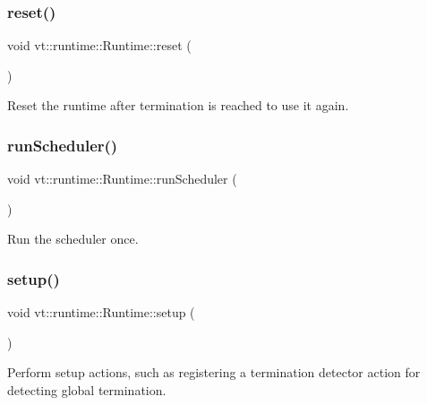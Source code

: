 \subsubsection{\texorpdfstring{reset()}{reset()}}
{\footnotesize\ttfamily void vt\+::runtime\+::\+Runtime\+::reset (\begin{DoxyParamCaption}{ }\end{DoxyParamCaption})}



Reset the runtime after termination is reached to use it again. 

\mbox{\label{structvt_1_1runtime_1_1_runtime_ab9cfe09835261971b73435e0572fee00}} 
\subsubsection{\texorpdfstring{run\+Scheduler()}{runScheduler()}}
{\footnotesize\ttfamily void vt\+::runtime\+::\+Runtime\+::run\+Scheduler (\begin{DoxyParamCaption}{ }\end{DoxyParamCaption})}



Run the scheduler once. 

\mbox{\label{structvt_1_1runtime_1_1_runtime_a1c4fda11afb43bb2607cd1f00686550c}} 
\subsubsection{\texorpdfstring{setup()}{setup()}}
{\footnotesize\ttfamily void vt\+::runtime\+::\+Runtime\+::setup (\begin{DoxyParamCaption}{ }\end{DoxyParamCaption})\hspace{0.3cm}{\ttfamily [protected]}}



Perform setup actions, such as registering a termination detector action for detecting global termination. 

\mbox{\label{structvt_1_1runtime_1_1_runtime_af87ef11218f0c1d095dcdcd4cfe4521e}} 
